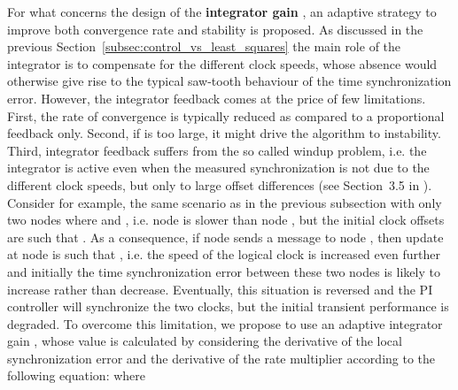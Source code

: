 \documentclass[english,a4paper,10pt,final]{article}
\numberwithin{equation}{section}
\numberwithin{figure}{section}
\begin{document}
For what concerns the design of the \textbf{integrator gain} , an adaptive strategy to improve both convergence rate and stability is proposed. As discussed in the previous Section~\ref{subsec:control_vs_least_squares} the main role of the integrator is to compensate for the different clock speeds, whose absence would otherwise give rise to the typical saw-tooth behaviour of the time synchronization error. However, the integrator feedback comes at the price of few limitations. First, the rate of convergence is typically reduced as compared to a proportional feedback only. Second, if  is too large, it might drive the algorithm to instability. Third, integrator feedback suffers from the so called windup problem, i.e. the integrator is active even when the measured synchronization is not due to the different clock speeds, but only to large offset differences (see Section~3.5 in \cite{Astrom:95}). Consider for example, the same scenario as in the previous subsection with only two nodes where  and , i.e. node  is slower than node , but the initial clock offsets are such that . As a consequence, if node  sends a message to node , then update at node  is such that , i.e. the speed of the logical clock  is increased even further and initially the time synchronization error between these two nodes is likely to increase rather than decrease. Eventually, this situation is reversed and the PI controller will synchronize the two clocks, but the initial transient performance is degraded. To overcome this limitation, we propose to use an adaptive integrator gain , whose value is calculated by considering the derivative of the local synchronization error  and the derivative of the rate multiplier   according to the following equation:
 where 

 
\end{document}
